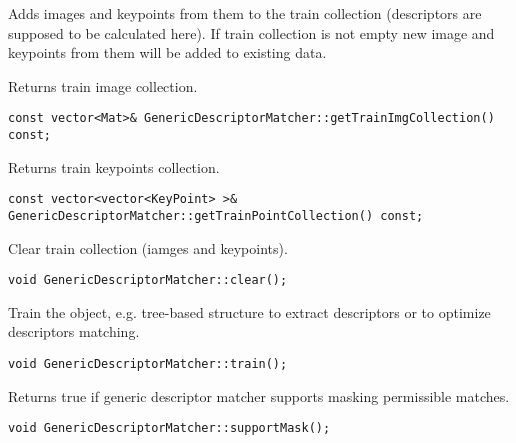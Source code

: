 Adds images and keypoints from them to the train collection (descriptors are supposed to be calculated here).
If train collection is not empty new image and keypoints from them will be added to 
existing data.


\begin{description}
\end{description}

Returns train image collection.

\begin{lstlisting}
const vector<Mat>& GenericDescriptorMatcher::getTrainImgCollection() const;
\end{lstlisting}

Returns train keypoints collection.

\begin{lstlisting}
const vector<vector<KeyPoint> >& 
GenericDescriptorMatcher::getTrainPointCollection() const;
\end{lstlisting}

Clear train collection (iamges and keypoints).

\begin{lstlisting}
void GenericDescriptorMatcher::clear();
\end{lstlisting}

Train the object, e.g. tree-based structure to extract descriptors or 
to optimize descriptors matching.

\begin{lstlisting}
void GenericDescriptorMatcher::train();
\end{lstlisting}

Returns true if generic descriptor matcher supports masking permissible matches.

\begin{lstlisting}
void GenericDescriptorMatcher::supportMask();
\end{lstlisting}

